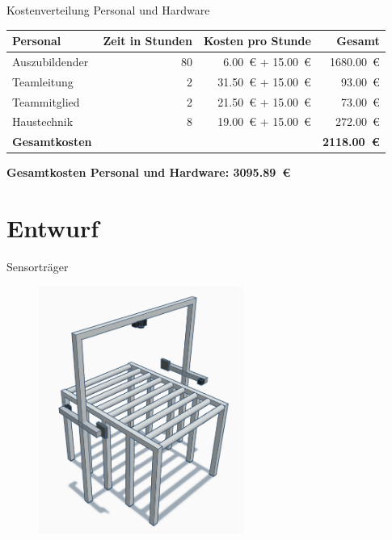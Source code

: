 \documentclass[10pt,ngerman]{beamer}
\begin{document}
\begin{frame}[fragile]{Kostenverteilung Personal und Hardware}
  \begin{table}[htbp]
    \centering
    \begin{tabular}{lrrr}
      \textbf{Personal}     & \textbf{Zeit in Stunden} & \textbf{Kosten pro Stunde}     & \textbf{Gesamt}          \\ \hline
      Auszubildender        & 80                       & \SI{6.00}{€} + \SI{15.00}{€}   & \SI{1680.00}{€}          \\
      Teamleitung           & 2                        & \SI{31.50}{€}  + \SI{15.00}{€} & \SI{93.00}{€}            \\
      Teammitglied          & 2                        & \SI{21.50}{€}  + \SI{15.00}{€} & \SI{73.00}{€}            \\
      Haustechnik           & 8                        & \SI{19.00}{€}  + \SI{15.00}{€} & \SI{272.00}{€}           \\ \hline
      \textbf{Gesamtkosten} &                          &                                & \textbf{\SI{2118.00}{€}}
    \end{tabular}
  \end{table}

  \vspace{0.4cm}

  \textbf{Gesamtkosten Personal und Hardware: \SI{3095.89}{€}}
\end{frame}



\section{Entwurf}
\begin{frame}[fragile]{Sensorträger}
  \begin{figure}[htpb]
    \centering
    \includegraphics[width=0.6\textwidth]{files/Sensortraeger/Skizze_Sensor_Traeger_3D_verdreht_cropped.png}
  \end{figure}
\end{frame}
\end{document}
